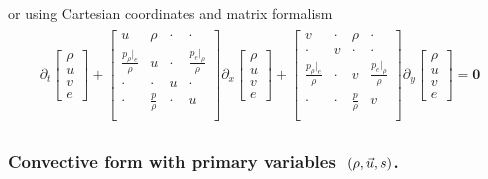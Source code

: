 \documentclass[letterpaper,10pt,english]{jupyterBook}
\begin{document}
\sphinxAtStartPar
or using Cartesian coordinates and matrix formalism
\begin{equation}\label{equation:ch/pde/hyperbolic-nd-euler:eq:pde:hyperbolic:differential:convective:euler:rho-u-e:mat}
\begin{split}\begin{aligned}
  \partial_t \begin{bmatrix} \rho \\ u \\ v \\ e \end{bmatrix}
 + \begin{bmatrix}
   u                      & \rho            & \cdot & \cdot \\
   \frac{p_\rho|_e}{\rho} & u               & \cdot & \frac{p_e|_\rho}{\rho}  \\
   \cdot                  & \cdot           & u     & \cdot  \\
   \cdot                  & \frac{p}{\rho}  & \cdot & u \\
   \end{bmatrix} \partial_x \begin{bmatrix} \rho \\ u \\ v \\ e \end{bmatrix}
 + \begin{bmatrix}
   v                      & \cdot           & \rho           & \cdot \\
   \cdot                  & v               & \cdot          & \cdot \\
   \frac{p_\rho|_e}{\rho} & \cdot           & v              & \frac{p_e|_\rho}{\rho}  \\
   \cdot                  & \cdot           & \frac{p}{\rho} & v \\
   \end{bmatrix} \partial_y \begin{bmatrix} \rho \\ u \\ v \\ e \end{bmatrix} = \mathbf{0}
\end{aligned}\end{split}
\end{equation}\subsubsection*{Convective form with primary variables \protect\(\ (\rho, \vec{u}, s)\protect\).}
\end{document}

